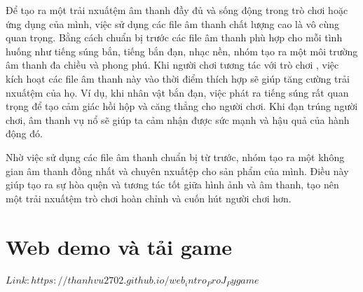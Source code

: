 \documentclass[a4paper]{article}
\begin{document}
Để tạo ra một trải nxuấtệm âm thanh đầy đủ và sống động trong trò chơi
hoặc ứng dụng của mình, việc sử dụng các file âm thanh chất lượng cao là vô cùng quan trọng. Bằng cách chuẩn bị trước các file âm thanh phù hợp cho mỗi tình huống như tiếng súng bắn, tiếng bắn đạn, nhạc nền, nhóm tạo ra một môi trường âm thanh đa chiều và phong phú. Khi người chơi tương tác với trò chơi , việc kích hoạt các file âm thanh này vào thời điểm thích hợp sẽ giúp tăng cường trải nxuấtệm của họ. Ví dụ, khi nhân vật bắn đạn, việc phát ra tiếng súng rất quan trọng để tạo cảm giác hồi hộp và căng thẳng cho người chơi. Khi đạn trúng người chơi, âm thanh vụ nổ sẽ giúp ta cảm nhận được sức mạnh và hậu quả của hành động đó.

Nhờ việc sử dụng các file âm thanh chuẩn bị từ trước, nhóm tạo ra một
không gian âm thanh đồng nhất và chuyên nxuấtệp cho sản phẩm của mình. Điều
này giúp tạo ra sự hòa quện và tương tác tốt giữa hình ảnh và âm thanh, tạo
nên một trải nxuấtệm trò chơi hoàn chỉnh và cuốn hút người chơi hơn.

\newpage
\section{Web demo và tải game}
\href{https://thanhvu2702.github.io/web_intro_ProJ_Pygame}{$Link: https://thanhvu2702.github.io/web_intro_ProJ_Pygame$}


\end{document}
